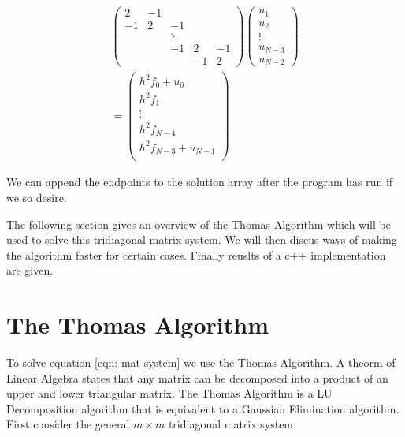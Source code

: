 \documentclass[twocolumn, groupedaddress]{revtex4-1}
\begin{document}
\begin{align}
\label{eqn: mat system}
\left( \begin{array}{ccccc}
	 2 & -1 &        &    &    \\
	-1 &  2 &   -1   &    &    \\
	   &    & \ddots &    &    \\
	   &	    &   -1   &  2 & -1 \\
	   &    &        & -1 &  2
   \end{array} \right)
\left( \begin{array}{c}
	u_1     \\
	u_2     \\
	\vdots  \\
	u_{N-3} \\
	u_{N-2}
   \end{array} \right) \nonumber
 \\ =
\left( \begin{array}{c}
	h^2 f_0 + u_0     \\
	h^2 f_1           \\
	\vdots        \\
	h^2 f_{N-4}       \\
	h^2 f_{N-3} + u_{N-1} \\
   \end{array} \right)   
\end{align}

We can append the endpoints to the solution array after the program has run if we so desire.

The following section gives an overview of the Thomas Algorithm which will be used to solve this tridiagonal matrix system.  We will then discus ways of making the algorithm faster for certain cases.  Finally reuslts of a c++ implementation are given.

\section{The Thomas Algorithm}
To solve equation \ref{eqn: mat system} we use the Thomas Algorithm.  A theorm of Linear Algebra states that any matrix can be decomposed into a product of an upper and lower triangular matrix.  The Thomas Algorithm is a LU Decomposition algorithm that is equivalent to a Gaussian Elimination algorithm.  First consider the general $m\times m$ tridiagonal matrix system.
\end{document}
